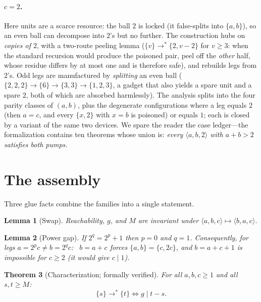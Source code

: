 \documentclass[11pt]{article}
\newtheorem{theorem}{Theorem}[section]
\newtheorem{lemma}[theorem]{Lemma}
\theoremstyle{definition}
\theoremstyle{remark}
\newcommand{\lie}[3]{\langle #1,#2,#3\rangle}
\newcommand{\ms}[1]{\{#1\}}
\newcommand{\reach}{\longrightarrow^{*}}
\begin{document}
\paragraph{$c=2$.}
Here units are a scarce resource: the ball $2$ is locked (it false-splits
into $\{a,b\}$), so an even ball can decompose into $2$'s but no further.
The construction hubs on \emph{copies of $2$}, with a two-route peeling
lemma ($\ms{v}\reach\ms{2,v-2}$ for $v\ge3$: when the standard recursion
would produce the poisoned pair, peel off the \emph{other} half, whose
residue differs by at most one and is therefore safe), and rebuilds legs
from $2$'s.  Odd legs are manufactured by \emph{splitting} an even ball
($\ms{2,2,2}\to\ms{6}\to\ms{3,3}\to\ms{1,2,3}$, a gadget that also yields a
spare unit and a spare $2$, both of which are absorbed harmlessly).  The
analysis splits into the four parity classes of $(a,b)$, plus the
degenerate configurations where a leg equals $2$ (then $a=c$, and every
$\{x,2\}$ with $x=b$ is poisoned) or equals $1$; each is closed by a
variant of the same two devices.  We spare the reader the case ledger---the
formalization contains ten theorems whose union is: \emph{every
$\lie{a}{b}{2}$ with $a+b>2$ satisfies both pumps.}

\section{The assembly}\label{sec:assembly}

Three glue facts combine the families into a single statement.

\begin{lemma}[Swap]\label{lem:swap}
Reachability, $g$, and $M$ are invariant under $\lie{a}{b}{c}\mapsto
\lie{b}{a}{c}$.
\end{lemma}

\begin{lemma}[Power gap]\label{lem:powgap}
If $2^q=2^p+1$ then $p=0$ and $q=1$.  Consequently, for legs $a=2^pc\ne
b=2^qc$: \ $b=a+c$ forces $\{a,b\}=\{c,2c\}$, and $b=a+c+1$ is impossible
for $c\ge2$ (it would give $c\mid 1$).
\end{lemma}

\begin{theorem}[Characterization; formally verified]\label{thm:main}
For all $a,b,c\ge1$ and all $s,t\ge M$:
\[
\ms{s}\reach\ms{t}\iff g\mid t-s.
\]
\end{theorem}
\end{document}
